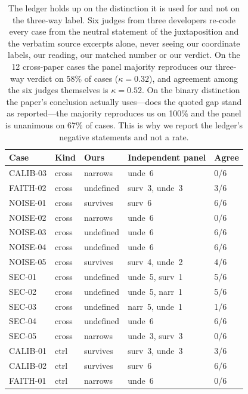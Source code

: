 \begin{table}[t]
\centering\scriptsize
\setlength{\tabcolsep}{3pt}
\begin{tabular}{@{}lllll@{}}
\toprule
Case & Kind & Ours & Independent panel & Agree \\
\midrule
CALIB-03 & cross & narrows & unde~6 & 0/6 \\
FAITH-02 & cross & undefined & surv~3, unde~3 & 3/6 \\
NOISE-01 & cross & survives & surv~6 & 6/6 \\
NOISE-02 & cross & narrows & unde~6 & 0/6 \\
NOISE-03 & cross & undefined & unde~6 & 6/6 \\
NOISE-04 & cross & undefined & unde~6 & 6/6 \\
NOISE-05 & cross & survives & surv~4, unde~2 & 4/6 \\
SEC-01 & cross & undefined & unde~5, surv~1 & 5/6 \\
SEC-02 & cross & undefined & unde~5, narr~1 & 5/6 \\
SEC-03 & cross & undefined & narr~5, unde~1 & 1/6 \\
SEC-04 & cross & undefined & unde~6 & 6/6 \\
SEC-05 & cross & narrows & unde~3, surv~3 & 0/6 \\
CALIB-01 & ctrl & survives & surv~3, unde~3 & 3/6 \\
CALIB-02 & ctrl & survives & surv~6 & 6/6 \\
FAITH-01 & ctrl & narrows & unde~6 & 0/6 \\
\bottomrule
\end{tabular}
\caption{The ledger holds up on the distinction it is used for and not on the three-way label. Six judges from three developers re-code every case from the neutral statement of the juxtaposition and the verbatim source excerpts alone, never seeing our coordinate labels, our reading, our matched number or our verdict. On the 12 cross-paper cases the panel majority reproduces our three-way verdict on 58\% of cases ($\kappa=0.32$), and agreement among the six judges themselves is $\kappa=0.52$. On the binary distinction the paper's conclusion actually uses---does the quoted gap stand as reported---the majority reproduces us on 100\% and the panel is unanimous on 67\% of cases. This is why we report the ledger's negative statements and not a rate.}
\label{tab:ledger-recoding}
\end{table}

